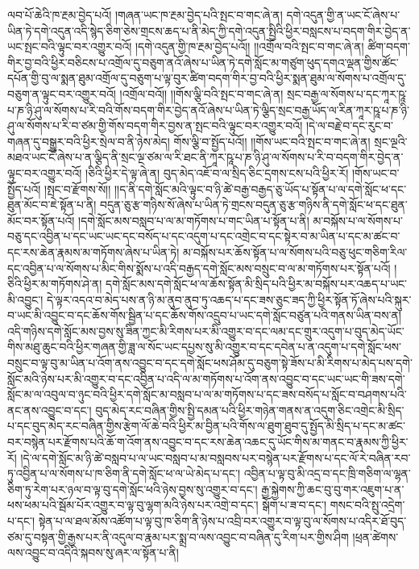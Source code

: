 ལབ་པོ་ཆེའི་ཁ་རྔམ་བྱེད་པའོ། །གཞན་ཡང་ཁ་རྔམ་བྱེད་པའི་སྤང་བ་གང་ཞེ་ན། དགེ་འདུན་གྱི་ན་ཡང་ངོ་ཞེས་པ་ཡིན་ཏེ་དགེ་འདུན་འདི་སྙེད་ཅིག་ཅེས་གྲངས་ཆད་པ་ནི་མེད་ཀྱི་དགེ་འདུན་སྤྱིའི་ཕྱིར་བསླངས་པ་བདག་གིར་བྱེད་ན་ཡང་སྤང་བའི་ལྟུང་བར་འགྱུར་བའོ། །དགེ་འདུན་གྱི་ཁ་རྔམ་བྱེད་པའོ།། །།འགྲོལ་བའི་སྤང་བ་གང་ཞེ་ན། ཚིག་བདག་གིར་བྱ་བའི་ཕྱིར་བཅིངས་པ་འགྲོལ་དུ་བཅུག་ནའོ་ཞེས་པ་ཡིན་ཏེ་དགེ་སློང་མ་གཙུག་ཕུད་དགའ་ལྡན་གྱིས་ཚོང་དཔོན་གྱི་བུ་ལ་སྨན་ཐུམ་འགྲོལ་དུ་བཅུག་པ་ལྟ་བུར་ཚིག་བདག་གིར་བྱ་བའི་ཕྱིར་སྨན་ཐུམ་ལ་སོགས་པ་འགྲོལ་དུ་བཅུག་ན་ལྟུང་བར་འགྱུར་བའོ། །འགྲོལ་བའོ།། །།གོས་ལྕི་བའི་སྤང་བ་གང་ཞེ་ན། སྲང་བརྒྱ་ལ་སོགས་པ་དང་ཀཱར་ཥཱ་པ་ཎ་ཉི་ཤུ་ལ་སོགས་པ་རི་བའི་གོས་བདག་གིར་བྱེད་ནའོ་ཞེས་པ་ཡིན་ཏེ་ལྕིད་སྲང་བརྒྱ་ཡོད་ལ་རིན་ཀཱར་ཥཱ་པ་ཎ་ཉི་ཤུ་ལ་སོགས་པ་རི་བ་ཙམ་གྱི་གོས་བདག་གིར་བྱས་ན་སྤང་བའི་ལྟུང་བར་འགྱུར་བའོ། །དེ་ལ་བརྗེ་བ་དང་རུང་བ་གཞན་དུ་བསྒྱུར་བའི་ཕྱིར་སྲེལ་བ་ནི་ཉེས་མེད། གོས་ལྕི་བ་སྤྱོད་པའོ།། །།གོས་ཡང་བའི་སྤང་བ་གང་ཞེ་ན། སྲང་ལྔའི་མཐའ་ཡང་ངོ་ཞེས་པ་ན་ལྕིད་ནི་སྲང་ལྔ་ཙམ་ལ་རི་ཐང་ནི་ཀཱར་ཥཱ་པ་ཎ་ཉི་ཤུ་ལ་སོགས་པ་རི་བ་བདག་གིར་བྱེད་ན་ལྟུང་བར་འགྱུར་བའོ། །ཅིའི་ཕྱིར་དེ་ལྟ་ཞེ་ན། བུད་མེད་འཇོ་བ་ལ་སྲིད་ཅིང་དྲགས་ངས་པའི་ཕྱིར་རོ། །གོས་ཡང་བ་སྤྱོད་པའོ། །སྤང་བ་རྫོགས་སོ།། །།ད་ནི་དགེ་སློང་མའི་ལྟུང་བ་ཉི་ཚེ་བརྒྱ་བརྒྱད་ཅུ་ཡོད་པ་སྟོན་པ་ལ་དགེ་སློང་ཕ་དང་ཐུན་མོང་བ་ཇེ་སྟོན་པ་ནི། བདུན་ཅུ་རྩ་གཉིས་སོ་ཞེས་པ་ཡིན་ཏེ་གྲངས་བདུན་ཅུ་རྩ་གཉིས་ནི་དགེ་སློང་ཕ་དང་ཐུན་མོང་བར་སྟོན་པའོ། །དགེ་སློང་མས་བསླབ་པ་ལ་མ་གཏོགས་པ་གང་ཡིན་པ་སྟོན་པ་ནི། མ་བསྐོས་པ་ལ་སོགས་པ་བཅུ་དང་འབྱིན་པ་དང་ཡང་ཡང་དང་བསོད་པ་དང་འདུག་པ་དང་འགྲེང་བ་དང་སྟེར་བ་མ་ཡིན་པ་དང་མ་ཚང་བ་དང་རས་ཆེན་རྣམས་མ་གཏོགས་ཞེས་པ་ཡིན་ཏེ། མ་བསྐོས་པར་ཆོས་སྟོན་པ་ལ་སོགས་པའི་བཅུ་ཕུང་གཅིག་རིལ་དང་འབྱིན་པ་ལ་སོགས་པ་མིང་གིས་སྨོས་པ་འདི་བརྒྱད་དགེ་སློང་མས་བསྲུང་བ་ལ་མ་གཏོགས་པར་སྟོན་པའོ། །ཅིའི་ཕྱིར་མ་གཏོགས་ཤེ་ན། དགེ་སློང་མས་དགེ་སློང་ཕ་ལ་ཆོས་སྟོན་མི་སྲིད་པའི་ཕྱིར་མ་བསྐོས་པར་འཆད་པ་ཡང་མི་འབྱུང་། དེ་ལྟར་འདའ་བ་མེད་པས་ན་ཉི་མ་ནུབ་ནུབ་ཏུ་འཆད་པ་དང་ཟས་ཅུང་ཟད་ཀྱི་ཕྱིར་སྟོན་ཏོ་ཞེས་པའི་སྐུར་བ་ཡང་མི་འབྱུང་བ་དང་ཆོས་གོས་སྦྱིན་པ་དང་ཆོས་གོས་འདྲུབ་པ་ཡང་དགེ་སློང་བཙུན་པའི་གནས་ཡིན་བས་ན། འདི་གཉིས་དགེ་སློང་མས་བྱས་སུ་ཟིན་ཀྱང་མི་རིགས་པར་མི་འགྱུར་བ་དང་ལམ་དང་གྲུར་འདུག་པ་བུད་མེད་ཡོང་གིས་མཐུ་ཆུང་བའི་ཕྱིར་གཞན་གྱི་ཟླ་ལ་སོང་ཡང་དཔྱས་སུ་མི་འགྱུར་བ་དང་དབེན་པ་ན་འདུག་པ་དགེ་སློང་ཕས་བསྲུང་བ་ལྟ་བུ་མ་ཡིན་པ་འོག་ནས་འབྱུང་བ་དང་དགེ་སློང་ཕས་ཤོམ་དུ་བཅུག་སྟེ་ཟོས་པ་མི་རིགས་པ་མེད་པས་དགེ་སློང་མའི་ཉེས་པར་མི་འགྱུར་བ་དང་འབྱིན་པ་འདི་ལ་མ་གཏོགས་པ་འོག་ནས་འབྱུང་བ་དང་ཡང་ཡང་གི་ཟས་དགེ་སློང་མ་ལ་འབུལ་བ་ཉུང་བའི་ཕྱིར་དགེ་སློང་མ་བསླབ་པ་ལ་མ་གཏོགས་པ་དང་ཟས་བསོད་པ་སློང་བ་བཤགས་པའི་ནང་ནས་འབྱུང་བ་དང་། བུད་མེད་རང་བཞིན་གྱིས་སྤྱི་དམན་པའི་ཕྱིར་གཉེན་གནས་ན་འདུག་ཅིང་འགྲེང་མི་སྲིད་པ་དང་བུད་མེད་རང་བཞིན་གྱིས་རྩེག་ལོ་ཆེ་བའི་ཕྱིར་མ་བྱིན་པའི་གོས་ལ་ཐུག་ཐུབ་དུ་སྤྱོད་མི་སྲིད་པ་དང་མ་ཚང་བར་བསྙེན་པར་རྫོགས་པའི་ཆོ་ག་འོག་ནས་འབྱུང་བ་དང་རས་ཆེན་འཆང་དུ་ཡོང་གིས་མ་གནང་བ་རྣམས་ཀྱི་ཕྱིར་རོ། །དེ་ལ་དགེ་སློང་མ་ཉི་ཚེ་བསླབ་པ་ལ་ཡང་བསླབ་པ་མ་བསླབས་པར་བསྙེན་པར་རྫོགས་པ་དང་ལོ་རེ་བཞིན་རབ་ཏུ་འབྱིན་པ་ལ་སོགས་པ་ཁ་ཅིག་ནི་དགེ་སློང་ཕ་ལ་ཡེ་མེད་པ་དང་། འབྱིན་པ་ལྟ་བུ་མི་འདྲ་བ་དང་ཁྲི་གཅིག་ལ་ལྷན་ཅིག་ཏུ་རེག་པར་ཉལ་བ་ལྟ་བུ་དགེ་སློང་ཕའི་ཉེས་བྱས་སུ་འགྱུར་བ་དང་། རྒྱ་སྐྱེགས་ཀྱི་ཆང་བུ་བུ་གར་འཇུག་པ་ན་ཕས་ཕམ་པའི་སྦོམ་པོར་འགྱུར་བ་ལྟ་བུ་ལྷག་མའི་ཉེས་པར་འགྲེ་བ་དང་། སྒོག་པ་ཟ་བ་དང་། གསང་བའི་སྤུ་འདྲེག་པ་དང་། སྟེན་པ་ལ་ཐལ་མོས་འཚོག་པ་ལྟ་བུ་ཁ་ཅིག་ནི་ཉེས་པ་འབྲི་བར་འགྱུར་བ་ལྟ་བུ་ལ་སོགས་པ་འདིར་ཐོ་བུད་ཙམ་དུ་བསྟན་གྱི་རྒྱས་པར་ནི་འདུལ་བ་རྣམ་པར་སྨྲ་བ་ལས་འབྱུང་བ་བཞིན་དུ་རིག་པར་གྱིས་ཤིག །ཕྲན་ཚེགས་ལས་འབྱུང་བ་འདིའི་སྐབས་སུ་ཞར་ལ་སྟོན་པ་ནི། 